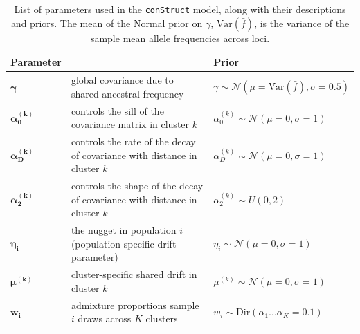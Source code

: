 \documentclass[12pt]{article}
\begin{document}
\begin{centering}
\begin{table}
\begin{tabular}{| >{\centering\arraybackslash}m{2.1cm} | m{5.2cm} | >{\centering\arraybackslash}m{5.1cm} |}
	\hline
	\textbf{Parameter} & \centering{\textbf{Description}} & \textbf{Prior}\\ \hline
	$\boldsymbol{\gamma}$ & 
		global covariance due to shared ancestral frequency & 
		$\gamma \sim \mathcal{N}(\mu = \text{Var}(\bar{f}), \sigma = 0.5)$\\ \hline
	$\boldsymbol{\alpha^{(k)}_0}$ & 
		controls the sill of the covariance matrix in cluster $k$& 
		$\alpha^{(k)}_0 \sim \mathcal{N}(\mu = 0, \sigma = 1)$\\ \hline
	$\boldsymbol{\alpha^{(k)}_D}$ & 
		controls the rate of the decay of covariance with distance in cluster $k$& 
		$\alpha^{(k)}_D \sim \mathcal{N}(\mu = 0, \sigma = 1)$\\ \hline
	$\boldsymbol{\alpha^{(k)}_2}$ & 
		controls the shape of the decay of covariance with distance in cluster $k$ & 
		$\alpha^{(k)}_2 \sim U(0,2)$\\ \hline
	$\boldsymbol{\eta_i}$ & 
		the nugget in population $i$ (population specific drift parameter)  & 
		$\eta_i \sim \mathcal{N}(\mu = 0, \sigma = 1)$\\ \hline
	$\boldsymbol{\mu^{(k)}}$ & 
		cluster-specific shared drift in cluster $k$ &
		 $\mu^{(k)} \sim \mathcal{N}(\mu = 0, \sigma = 1)$\\ \hline
	$\boldsymbol{w_i}$ &
		admixture proportions sample $i$ draws across $K$ clusters &
		$w_i \sim \text{Dir}(\alpha_{1} ... \alpha_{K}=0.1)$  \\ \hline
	\hline
\end{tabular}
\caption{
List of parameters used in the \texttt{conStruct} model, along with their descriptions and priors.
The mean of the Normal prior on $\gamma$, $\text{Var}(\bar{f})$, is the variance of the sample mean allele frequencies across loci.
}\label{tab:param_prior_tab}
\end{table}
\end{centering}

\newpage
\end{document}
